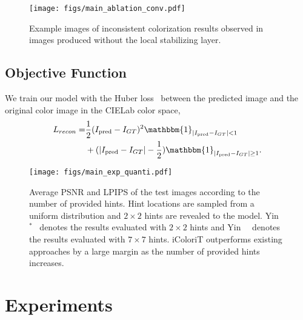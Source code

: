 \documentclass[10pt,twocolumn,letterpaper]{article}
\begin{document}
\begin{figure}[t]
    \centering
    \texttt{[image: figs/main\_ablation\_conv.pdf]}
    \vspace{-0.4cm}
    \caption{Example images of inconsistent colorization results observed in images produced without the local stabilizing layer. }
    \label{fig:ablation_conv}
    \vspace{-0.2cm}
\end{figure}

\subsection{Objective Function}

We train our model with the Huber loss~\cite{huber} between the predicted image and the original color image in the CIELab color space, 
\vspace{-0.2cm}
\begin{equation}
\begin{split}
    L_{recon} = &\frac{1}{2}(I_{\text{pred}} - I_{GT})^2\mathbbm{1}_{\left|I_{\text{pred}} - I_{GT}\right| < 1} \\ 
    &+ (\left|I_{\text{pred}} - I_{GT}\right|-\frac{1}{2})\mathbbm{1}_{\left|I_{\text{pred}} - I_{GT}\right| \geq 1}.
\end{split}
\vspace{-0.2cm}
\end{equation}



\begin{figure*}[ht]
    \centering
    \texttt{[image: figs/main\_exp\_quanti.pdf]}
    \vspace{-0.6cm}
    \caption{Average PSNR and LPIPS of the test images according to the number of provided hints. Hint locations are sampled from a uniform distribution and $2\times 2$ hints are revealed to the model. Yin~\etal$^*$~\cite{side} denotes the results evaluated with $2\times 2$ hints and Yin~\etal~\cite{side} denotes the results evaluated with $7\times 7$ hints. iColoriT outperforms existing approaches by a large margin as the number of provided hints increases.}
    \label{fig:exp_quanti_psnr}
    \vspace{-0.5cm}
\end{figure*}


\section{Experiments}
\label{sec:impl_details}
\vspace{-0.1cm}
\end{document}
